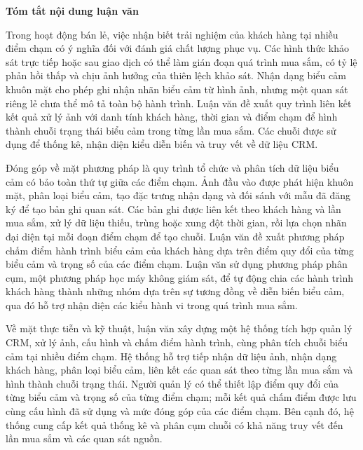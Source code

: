 \documentclass[../LuanVan.tex]{subfiles}
\begin{document}
\begin{center}
    \Large{\textbf{Tóm tắt nội dung luận văn}}\\
\end{center}
\vspace{1cm}

Trong hoạt động bán lẻ, việc nhận biết trải nghiệm của khách hàng tại nhiều điểm chạm có ý nghĩa đối với đánh giá chất lượng phục vụ. Các hình thức khảo sát trực tiếp hoặc sau giao dịch có thể làm gián đoạn quá trình mua sắm, có tỷ lệ phản hồi thấp và chịu ảnh hưởng của thiên lệch khảo sát. Nhận dạng biểu cảm khuôn mặt cho phép ghi nhận nhãn biểu cảm từ hình ảnh, nhưng một quan sát riêng lẻ chưa thể mô tả toàn bộ hành trình. Luận văn đề xuất quy trình liên kết kết quả xử lý ảnh với danh tính khách hàng, thời gian và điểm chạm để hình thành chuỗi trạng thái biểu cảm trong từng lần mua sắm. Các chuỗi được sử dụng để thống kê, nhận diện kiểu diễn biến và truy vết về dữ liệu CRM.

Đóng góp về mặt phương pháp là quy trình tổ chức và phân tích dữ liệu biểu cảm có bảo toàn thứ tự giữa các điểm chạm. Ảnh đầu vào được phát hiện khuôn mặt, phân loại biểu cảm, tạo đặc trưng nhận dạng và đối sánh với mẫu đã đăng ký để tạo bản ghi quan sát. Các bản ghi được liên kết theo khách hàng và lần mua sắm, xử lý dữ liệu thiếu, trùng hoặc xung đột thời gian, rồi lựa chọn nhãn đại diện tại mỗi đoạn điểm chạm để tạo chuỗi. Luận văn đề xuất phương pháp chấm điểm hành trình biểu cảm của khách hàng dựa trên điểm quy đổi của từng biểu cảm và trọng số của các điểm chạm. Luận văn sử dụng phương pháp phân cụm, một phương pháp học máy không giám sát, để tự động chia các hành trình khách hàng thành những nhóm dựa trên sự tương đồng về diễn biến biểu cảm, qua đó hỗ trợ nhận diện các kiểu hành vi trong quá trình mua sắm.

Về mặt thực tiễn và kỹ thuật, luận văn xây dựng một hệ thống tích hợp quản lý CRM, xử lý ảnh, cấu hình và chấm điểm hành trình, cùng phân tích chuỗi biểu cảm tại nhiều điểm chạm. Hệ thống hỗ trợ tiếp nhận dữ liệu ảnh, nhận dạng khách hàng, phân loại biểu cảm, liên kết các quan sát theo từng lần mua sắm và hình thành chuỗi trạng thái. Người quản lý có thể thiết lập điểm quy đổi của từng biểu cảm và trọng số của từng điểm chạm; mỗi kết quả chấm điểm được lưu cùng cấu hình đã sử dụng và mức đóng góp của các điểm chạm. Bên cạnh đó, hệ thống cung cấp kết quả thống kê và phân cụm chuỗi có khả năng truy vết đến lần mua sắm và các quan sát nguồn.
\end{document}

